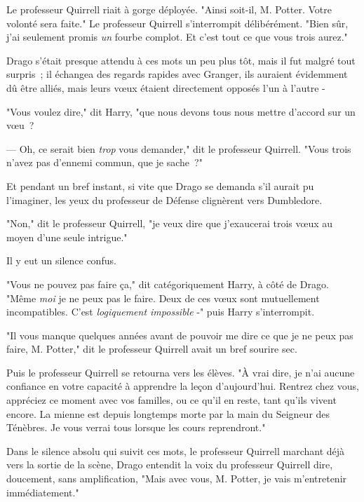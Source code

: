 Le professeur Quirrell riait à gorge déployée. "Ainsi soit-il, M. Potter. Votre volonté sera faite." Le professeur Quirrell s'interrompit délibérément. "Bien sûr, j'ai seulement promis \emph{un} fourbe complot. Et c'est tout ce que vous trois aurez."

Drago s'était presque attendu à ces mots un peu plus tôt, mais il fut malgré tout surpris~; il échangea des regards rapides avec Granger, ils auraient évidemment dû être alliés, mais leurs vœux étaient directement opposés l'un à l'autre -

"Vous voulez dire," dit Harry, "que nous devons tous nous mettre d'accord sur un vœu~?

--- Oh, ce serait bien \emph{trop} vous demander," dit le professeur Quirrell. "Vous trois n'avez pas d'ennemi commun, que je sache~?"

Et pendant un bref instant, si vite que Drago se demanda s'il aurait pu l'imaginer, les yeux du professeur de Défense clignèrent vers Dumbledore.

"Non," dit le professeur Quirrell, "je veux dire que j'exaucerai trois vœux au moyen d'une seule intrigue."

Il y eut un silence confus.

"Vous ne pouvez pas faire ça," dit catégoriquement Harry, à côté de Drago. "Même \emph{moi} je ne peux pas le faire. Deux de ces vœux sont mutuellement incompatibles. C'est \emph{logiquement impossible} -" puis Harry s'interrompit.

"Il vous manque quelques années avant de pouvoir me dire ce que je ne peux pas faire, M. Potter," dit le professeur Quirrell avait un bref sourire sec.

Puis le professeur Quirrell se retourna vers les élèves. "À vrai dire, je n'ai aucune confiance en votre capacité à apprendre la leçon d'aujourd'hui. Rentrez chez vous, appréciez ce moment avec vos familles, ou ce qu'il en reste, tant qu'ils vivent encore. La mienne est depuis longtemps morte par la main du Seigneur des Ténèbres. Je vous verrai tous lorsque les cours reprendront."

Dans le silence absolu qui suivit ces mots, le professeur Quirrell marchant déjà vers la sortie de la scène, Drago entendit la voix du professeur Quirrell dire, doucement, sans amplification, "Mais avec vous, M. Potter, je vais m'entretenir immédiatement."~ 

